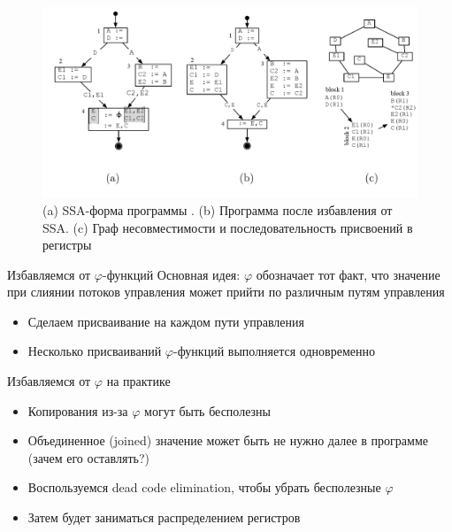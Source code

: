 \documentclass[aspectratio=169
  , xcolor={svgnames}
  , hyperref={ colorlinks,citecolor=DeepPink4
             , linkcolor=DarkRed,urlcolor=DarkBlue}
  , russian
  ]{beamer}
\theoremstyle{exerciseStyle1}
\begin{document}
\begin{frame}[fragile]
\begin{figure}
\centering
\includegraphics[width=.9\textwidth]{figures/regalloc-ssa}
\caption{ (a) SSA-форма программы . 
(b) Программа после избавления от SSA. 
(c) Граф несовместимости и последовательность присвоений в регистры }
\end{figure}
\end{frame}

\begin{frame}[fragile]{Избавляемся от  $\varphi$-функций}
Основная идея: $\varphi$ обозначает тот факт, что значение при слиянии потоков управления может прийти по различным путям управления
\begin{itemize}
\item Сделаем присваивание на каждом пути управления
\item Несколько присваиваний $\varphi$-функций выполняется одновременно
\end{itemize}
\begin{figure}
\centering

\end{figure}
\end{frame}

\begin{frame}[fragile]{Избавляемся от $\varphi$ на практике}
\begin{itemize}
\item Копирования из-за $\varphi$ могут быть бесполезны
\item Объединенное (joined) значение может быть не нужно далее в программе (зачем его оставлять?)
\item Воспользуемся dead code elimination, чтобы убрать бесполезные $\varphi$
\item Затем будет заниматься распределением регистров
\end{itemize}
\end{frame}
\end{document}
